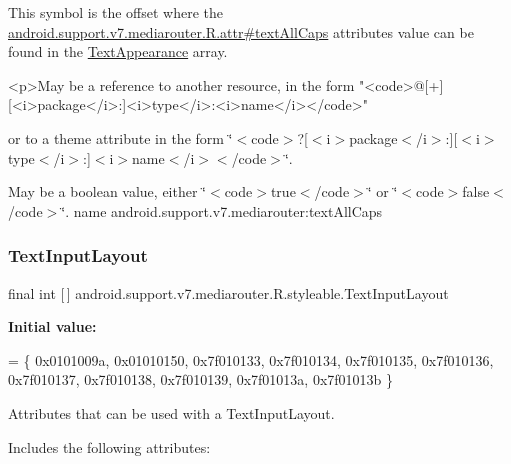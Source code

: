 This symbol is the offset where the \hyperlink{classandroid_1_1support_1_1v7_1_1mediarouter_1_1R_1_1attr_a3512dcd83093488c2c75e79b3685e5a2}{android.\+support.\+v7.\+mediarouter.\+R.\+attr\#text\+All\+Caps} attribute\textquotesingle{}s value can be found in the \hyperlink{classandroid_1_1support_1_1v7_1_1mediarouter_1_1R_1_1styleable_afa2418a8445abd4ca0361d2d60e02f3d}{Text\+Appearance} array.

\begin{DoxyVerb}      <p>May be a reference to another resource, in the form "<code>@[+][<i>package</i>:]<i>type</i>:<i>name</i></code>"
\end{DoxyVerb}
 or to a theme attribute in the form \char`\"{}$<$code$>$?\mbox{[}$<$i$>$package$<$/i$>$\+:\mbox{]}\mbox{[}$<$i$>$type$<$/i$>$\+:\mbox{]}$<$i$>$name$<$/i$>$$<$/code$>$\char`\"{}. 

May be a boolean value, either \char`\"{}$<$code$>$true$<$/code$>$\char`\"{} or \char`\"{}$<$code$>$false$<$/code$>$\char`\"{}.  name android.\+support.\+v7.\+mediarouter\+:text\+All\+Caps \mbox{\label{classandroid_1_1support_1_1v7_1_1mediarouter_1_1R_1_1styleable_a935a5feb3f0394eb1c07f26b207dfb2d}} 
\subsubsection{\texorpdfstring{Text\+Input\+Layout}{TextInputLayout}}
{\footnotesize\ttfamily final int \mbox{[}$\,$\mbox{]} android.\+support.\+v7.\+mediarouter.\+R.\+styleable.\+Text\+Input\+Layout\hspace{0.3cm}{\ttfamily [static]}}

{\bfseries Initial value\+:}
\begin{DoxyCode}
= \{
            0x0101009a, 0x01010150, 0x7f010133, 0x7f010134,
            0x7f010135, 0x7f010136, 0x7f010137, 0x7f010138,
            0x7f010139, 0x7f01013a, 0x7f01013b
        \}
\end{DoxyCode}
Attributes that can be used with a Text\+Input\+Layout. 

Includes the following attributes\+:

